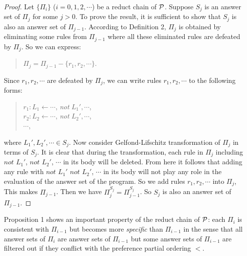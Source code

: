 \documentclass{tlp}
\begin{document}
\noindent
\begin{proof}
Let $\{\Pi_{i}\}$ ($i=0, 1, 2, \cdots$) be a reduct
chain of ${\cal P}$.
Suppose $S_{j}$ is an answer set of $\Pi_{j}$ for some $j>0$. To prove the
result, it is sufficient to show that
$S_{j}$ is also an answer set of $\Pi_{j-1}$.
According to Definition 2, $\Pi_{j}$ is obtained by eliminating
some rules from $\Pi_{j-1}$ where all these eliminated rules are
defeated by $\Pi_{j}$. So we can express:
\begin{quote}
$\Pi_{j}=\Pi_{j-1}-\{r_{1},r_{2},\cdots\}$.
\end{quote} 
Since $r_{1},r_{2}, \cdots$ are defeated by $\Pi_{j}$, we can write rules
$r_{1},r_{2}, \cdots$ to the following forms:
\begin{quote}
$r_{1}: L_{1}\leftarrow \cdots$, {\em not} $L_{1}', \cdots$,\\
\hspace*{.1in} $r_{2}: L_{2}\leftarrow \cdots$, {\em not} $L_{2}', \cdots$,\\
\hspace*{.1in} $\cdots$,
\end{quote} 
where $L_{1}',L_{2}',\cdots\in S_{j}$. Now consider Gelfond-Lifschitz transformation of
$\Pi_{j}$ in terms of $S_{j}$. It is clear that during the transformation, each
rule in $\Pi_{j}$ including $not$ $L_{1}'$, $not$ $L_{2}'$, $\cdots$ in
its body will be deleted. From here it follows that adding any rule with
$not$ $L_{1}'$ $not$ $L_{2}'$, $\cdots$  in its body will not play any role in the
evaluation of the answer set of the program. So we add
rules $r_{1}, r_{2}, \cdots$ into $\Pi_{j}$, This makes $\Pi_{j-1}$.
Then we have $\Pi_{j}^{S_{j}}=\Pi_{j-1}^{S_{j}}$.
So $S_{j}$ is also an answer set of $\Pi_{j-1}$.
\end{proof}


Proposition 1 shows an important property of the reduct chain
of ${\cal P}$: each $\Pi_{i}$ is consistent
with $\Pi_{i-1}$ but becomes more {\em specific} than
$\Pi_{i-1}$ in the sense
that all answer sets of $\Pi_{i}$ are answer sets of
$\Pi_{i-1}$ but some answer sets of $\Pi_{i-1}$ are
filtered out if they conflict with the preference partial ordering $<$.
\end{document}
